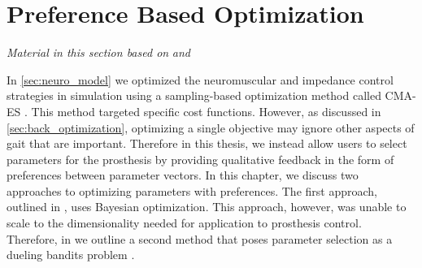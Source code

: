 \chapter{Preference Based Optimization}\label{sec:preference_optimization}

\graphicspath{{chapters/preference_optimization/figures/}}

\emph{Material in this section based on}
\citet{thatte2017sample}\cite{thatte2017sample} \emph{and}
\citet{thatte2018method}\cite{thatte2018method} 
\linebreak

In \cref{sec:neuro_model} we optimized the neuromuscular and impedance control
strategies in simulation using a sampling-based optimization method called
CMA-ES \citep{hansen2006cma}. This method targeted specific cost functions.
However, as discussed in \cref{sec:back_optimization}, optimizing a single
objective may ignore other aspects of gait that are important. Therefore in this
thesis, we instead allow users to select parameters for the prosthesis by
providing qualitative feedback in the form of preferences between parameter
vectors. In this chapter, we discuss two approaches to optimizing parameters
with preferences. The first approach, outlined in
, uses Bayesian optimization.
This approach, however, was unable to scale to the dimensionality needed for
application to prosthesis control. Therefore, in
 we outline a second method
that poses parameter selection as a dueling bandits problem \citep{yue2012k}.










